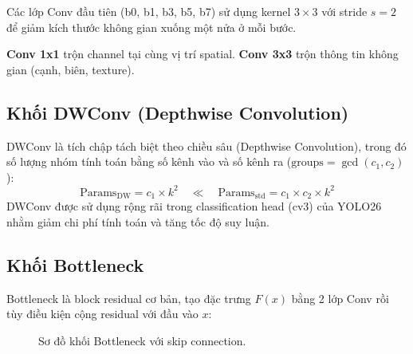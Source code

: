 Các lớp Conv đầu tiên (b0, b1, b3, b5, b7) sử dụng kernel $3 \times 3$ với stride $s=2$ để giảm kích thước không gian xuống một nửa ở mỗi bước.

\textbf{Conv 1x1} trộn channel tại cùng vị trí spatial. \textbf{Conv 3x3} trộn thông tin không gian (cạnh, biên, texture).

\subsection{Khối DWConv (Depthwise Convolution)}
\label{subsec:dwconv}

DWConv là tích chập tách biệt theo chiều sâu (Depthwise Convolution), trong đó số lượng nhóm tính toán bằng số kênh vào và số kênh ra ($\text{groups} = \gcd(c_1, c_2)$):
\begin{equation}
    \text{Params}_{\text{DW}} = c_1 \times k^2 \quad \ll \quad \text{Params}_{\text{std}} = c_1 \times c_2 \times k^2
\end{equation}
DWConv được sử dụng rộng rãi trong classification head (cv3) của YOLO26 nhằm giảm chi phí tính toán và tăng tốc độ suy luận.

\subsection{Khối Bottleneck}
\label{subsec:bottleneck}

Bottleneck là block residual cơ bản, tạo đặc trưng $F(x)$ bằng 2 lớp Conv rồi tùy điều kiện cộng residual với đầu vào $x$:

\begin{figure}[H]
\centering
{}
\caption{Sơ đồ khối Bottleneck với skip connection.}
\label{fig:bottleneck}
\end{figure}

